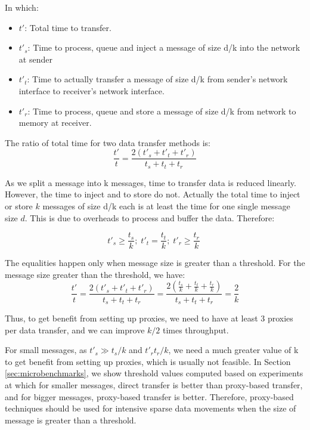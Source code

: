 In which:
\begin{itemize}
\item $t'$: Total time to transfer.
\item $t'_s$: Time to process, queue and inject a message of size d/k into the network at sender
\item $t'_t$: Time to actually transfer a message of size d/k from sender's network interface to receiver's network interface.
\item $t'_r$: Time to process, queue and store a message of size d/k from network to memory at receiver.
\end{itemize}

The ratio of total time for two data transfer methods is:
\begin{equation}
\frac{t'}{t} = \frac{2(t'_s + t'_t + t'_r)}{t_s + t_t + t_r} 
\end{equation}

As we split a message into k messages, time to transfer data is reduced linearly. However, the time to inject and  to store do not. Actually the total time to inject or store $k$ messages of size d/k each is at least the time for one single message size $d$. This is due to overheads to process and buffer the data. Therefore:

\begin{equation}
t'_s \ge \frac{t_s}{k}; \; 
t'_t = \frac{t_t}{k}; \; 
t'_r \ge \frac{t_r}{k}\; 
\end{equation}

The equalities happen only when message size is greater than a threshold. For the message size greater than  the threshold, we have:
\begin{equation}
\frac{t'}{t} = \frac{2(t'_s + t'_t + t'_r)}{t_s + t_t + t_r} = \frac{2(\frac{t_s}{k} + \frac{t_t}{k} + \frac{t_r}{k})}{t_s + t_t + t_r} = \frac{2}{k}
\end{equation}

Thus, to get benefit from setting up proxies, we need to have at least 3 proxies per data transfer, and we can improve $k/2$ times throughput.

For small messages, as $t'_s \gg t_s/k$ and $t'_r t_r/k$, we need a much greater value of k to get benefit from setting up proxies, which is usually not feasible. In Section \ref{sec:microbenchmarks}, we show threshold values computed based on experiments at which for smaller messages, direct transfer is better than proxy-based transfer, and for bigger messages, proxy-based transfer is better. Therefore, proxy-based techniques should be used for intensive sparse data movements when the size of message is greater than a threshold.

